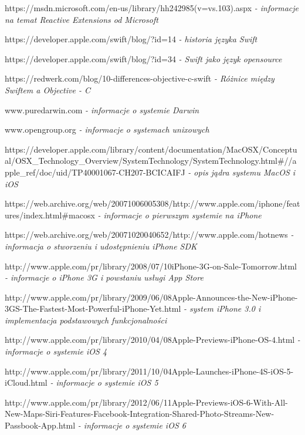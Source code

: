 \documentclass[12pt,oneside,a4paper]{report}
\begin{document}
\begin{thebibliography}{50}
 https://msdn.microsoft.com/en-us/library/hh242985(v=vs.103).aspx
\emph{- informacje na temat Reactive Extensions od Microsoft}

 https://developer.apple.com/swift/blog/?id=14
\emph{- historia języka Swift}

 https://developer.apple.com/swift/blog/?id=34
\emph{- Swift jako język opensource}

 https://redwerk.com/blog/10-differences-objective-c-swift
\emph{- Różnice między Swiftem a Objective - C}

 www.puredarwin.com 
\emph{ - informacje o systemie Darwin}

 www.opengroup.org \emph{ - informacje o systemach unixowych}

 https://developer.apple.com/library/content/documentation/MacOSX/Conceptual/OSX\_Technology\_Overview/SystemTechnology/SystemTechnology.html\#//apple\_ref/doc/uid/TP40001067-CH207-BCICAIFJ
\emph{ - opis jądra systemu MacOS i iOS}

 https://web.archive.org/web/20071006005308/http://www.apple.com/iphone/features/index.html\#macosx
\emph{ - informacje o pierwszym systemie na iPhone}

 https://web.archive.org/web/20071020040652/http://www.apple.com/hotnews
\emph{ - informacja o stworzeniu i udostępnieniu iPhone SDK}

 http://www.apple.com/pr/library/2008/07/10iPhone-3G-on-Sale-Tomorrow.html
\emph{ - informacje o iPhone 3G i powstaniu usługi App Store}

 http://www.apple.com/pr/library/2009/06/08Apple-Announces-the-New-iPhone-3GS-The-Fastest-Most-Powerful-iPhone-Yet.html
\emph{ - system iPhone 3.0 i implementacja podstawowych funkcjonalności}

http://www.apple.com/pr/library/2010/04/08Apple-Previews-iPhone-OS-4.html
\emph{ - informacje o systemie iOS 4}

http://www.apple.com/pr/library/2011/10/04Apple-Launches-iPhone-4S-iOS-5-iCloud.html
\emph{ - informacje o systemie iOS 5}

http://www.apple.com/pr/library/2012/06/11Apple-Previews-iOS-6-With-All-New-Maps-Siri-Features-Facebook-Integration-Shared-Photo-Streams-New-Passbook-App.html
\emph{ - informacje o systemie iOS 6}


\end{thebibliography}
\end{document}
